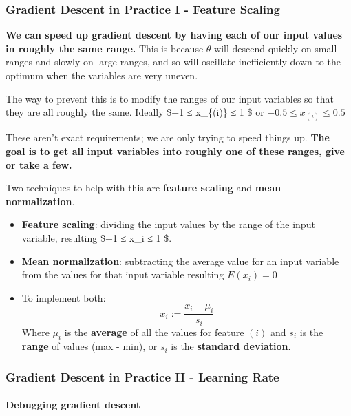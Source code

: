 \documentclass[11pt]{article}
\begin{document}
\hypertarget{gradient-descent-in-practice-i---feature-scaling}{%
\subsubsection{Gradient Descent in Practice I - Feature
Scaling}\label{gradient-descent-in-practice-i---feature-scaling}}

\textbf{We can speed up gradient descent by having each of our input
values in roughly the same range.} This is because \(\theta\) will
descend quickly on small ranges and slowly on large ranges, and so will
oscillate inefficiently down to the optimum when the variables are very
uneven.

The way to prevent this is to modify the ranges of our input variables
so that they are all roughly the same. Ideally \$−1 ≤ x\_\{(i)\} ≤ 1 \$
or \(−0.5 ≤ x_{(i)} ≤ 0.5\)

These aren't exact requirements; we are only trying to speed things up.
\textbf{The goal is to get all input variables into roughly one of these
ranges, give or take a few.}

Two techniques to help with this are \textbf{feature scaling} and
\textbf{mean normalization}.

\begin{itemize}
\item
  \textbf{Feature scaling}: dividing the input values by the range of
  the input variable, resulting \$−1 ≤ x\_i ≤ 1 \$.
\item
  \textbf{Mean normalization}: subtracting the average value for an
  input variable from the values for that input variable resulting
  \(E(x_i)=0\)
\item
  To implement both: \[
  x_i := \dfrac{x_i - \mu_i}{s_i}
  \] Where \(μ_i\) is the \textbf{average} of all the values for feature
  \((i)\) and \(s_i\) is the \textbf{range} of values (max - min), or
  \(s_i\) is the \textbf{standard deviation}.
\end{itemize}

\hypertarget{gradient-descent-in-practice-ii---learning-rate}{%
\subsubsection{Gradient Descent in Practice II - Learning
Rate}\label{gradient-descent-in-practice-ii---learning-rate}}

\hypertarget{debugging-gradient-descent}{%
\paragraph{Debugging gradient
descent}\label{debugging-gradient-descent}}
\end{document}
